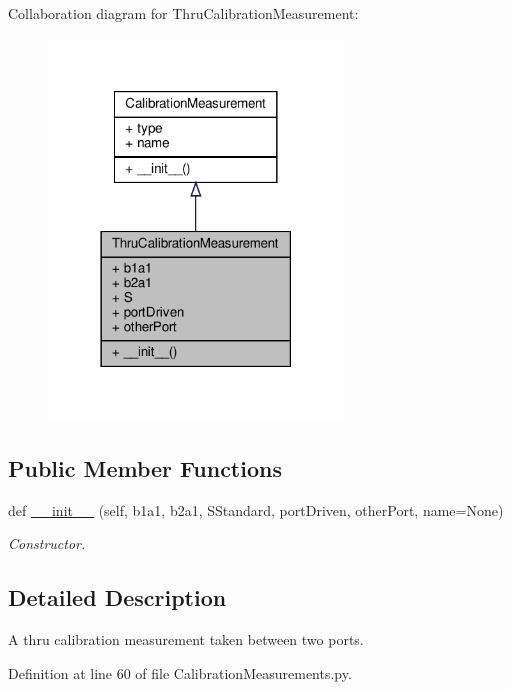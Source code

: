 Collaboration diagram for Thru\+Calibration\+Measurement\+:\nopagebreak
\begin{figure}[H]
\begin{center}
\leavevmode
\includegraphics[width=222pt]{classSignalIntegrity_1_1Measurement_1_1Calibration_1_1CalibrationMeasurements_1_1ThruCalibrationMeasurement__coll__graph}
\end{center}
\end{figure}
\subsection*{Public Member Functions}
\begin{DoxyCompactItemize}
\item 
def \hyperlink{classSignalIntegrity_1_1Measurement_1_1Calibration_1_1CalibrationMeasurements_1_1ThruCalibrationMeasurement_a8ec7025d943b2d2fe8d0b1761833aabd}{\+\_\+\+\_\+init\+\_\+\+\_\+} (self, b1a1, b2a1, S\+Standard, port\+Driven, other\+Port, name=None)
\begin{DoxyCompactList}\small\item\em Constructor. \end{DoxyCompactList}\end{DoxyCompactItemize}


\subsection{Detailed Description}
A thru calibration measurement taken between two ports. 



Definition at line 60 of file Calibration\+Measurements.\+py.



